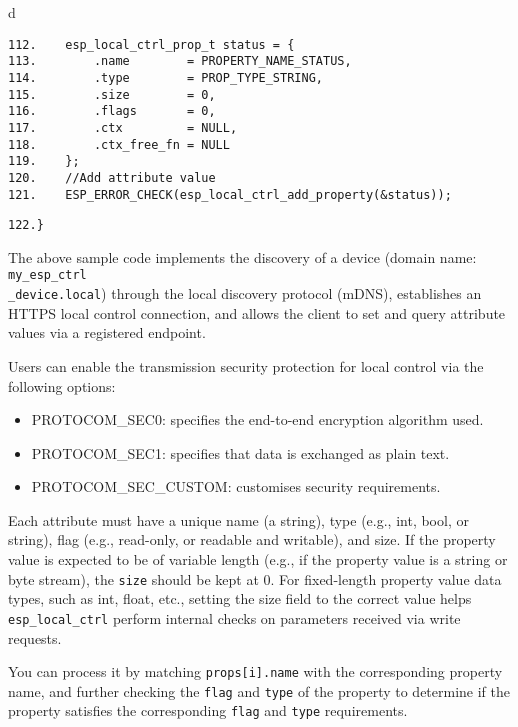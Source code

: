 \documentclass[a4paper,12pt]{book}
\begin{document}
\begin{codebloc}
\begin{tabular}{d}
\vspace{2pt}
\begin{verbatim}
112.    esp_local_ctrl_prop_t status = {
113.        .name        = PROPERTY_NAME_STATUS,
114.        .type        = PROP_TYPE_STRING,
115.        .size        = 0,
116.        .flags       = 0,
117.        .ctx         = NULL,
118.        .ctx_free_fn = NULL
119.    };
120.    //Add attribute value
121.    ESP_ERROR_CHECK(esp_local_ctrl_add_property(&status));
\end{verbatim}
\verb|122.}|
\end{tabular}
\end{codebloc}

The above sample code implements the discovery of a device (domain name: \verb|my_esp_ctrl|\\ \verb|_device.local|) through the local discovery protocol (mDNS), establishes an HTTPS local control connection, and allows the client to set and query attribute values via a registered endpoint.

Users can enable the transmission security protection for local control via the following options:

\begin{itemize}[noitemsep]
    \item PROTOCOM\_SEC0: specifies the end-to-end encryption algorithm used.
    \item PROTOCOM\_SEC1: specifies that data is exchanged as plain text.
    \item PROTOCOM\_SEC\_CUSTOM: customises security requirements.
\end{itemize}

Each attribute must have a unique name (a string), type (e.g., int, bool, or string), flag (e.g., read-only, or readable and writable), and size. If the property value is expected to be of variable length (e.g., if the property value is a string or byte stream), the \verb|size| should be kept at 0. For fixed-length property value data types, such as int, float, etc., setting the size field to the correct value helps \verb|esp_local_ctrl| perform internal checks on parameters received via write requests.

You can process it by matching \verb|props[i].name| with the corresponding property name, and further checking the \verb|flag| and \verb|type| of the property to determine if the property satisfies the corresponding \verb|flag| and \verb|type| requirements.
\end{document}
